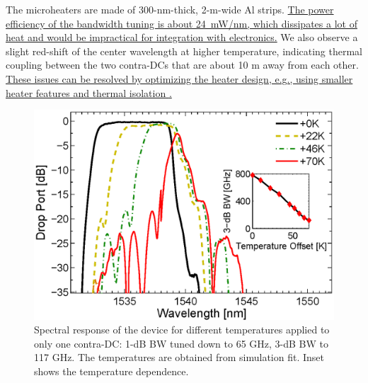 \documentclass[9pt,twocolumn,twoside]{osajnl}
\begin{document}
	The microheaters are made of 300-nm-thick, 2-\textmu m-wide Al strips.
	\uline{The power efficiency of the bandwidth tuning is about 24~mW/nm, which dissipates a lot of heat and would be impractical for integration with electronics.}
	We also observe a slight red-shift of the center wavelength at higher temperature, indicating thermal coupling between the two contra-DCs that are about 10 \textmu m away from each other.
	\uline{These issues can be resolved by optimizing the heater design, e.g., using smaller heater features and thermal isolation \cite{dong2010thermally}.}
	
	
	
	\begin{figure}[htbp]
		\centering
		\includegraphics[width=.99\columnwidth]{data/Band6}
		\caption{Spectral response of the device for different temperatures applied to only one contra-DC: 1-dB BW tuned down to 65 GHz, 3-dB BW to 117 GHz. The temperatures are obtained from simulation fit. Inset shows the temperature dependence.}
		\label{fig:bandTune}
	\end{figure} 
	
\end{document}
